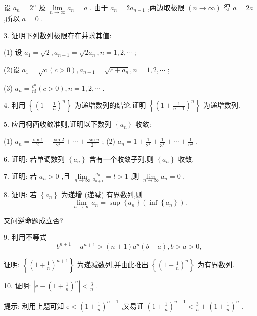 \begin{solution}
设 \({a}_{n} = {2}^{n}\) 及 \(\mathop{\lim }\limits_{{n \rightarrow  \infty }}{a}_{n} = a\) . 由于 \({a}_{n} = 2{a}_{n - 1}\) ,两边取极限 \(\left( {n \rightarrow  \infty }\right)\) 得 \(a = {2a}\) ,所以 \(a = 0\) .
\end{solution}


3. 证明下列数列极限存在并求其值:

(1) 设 \({a}_{1} = \sqrt{2},{a}_{n + 1} = \sqrt{2{a}_{n}},n = 1,2,\cdots\) ;

(2)设 \({a}_{1} = \sqrt{c}\left( {c > 0}\right) ,{a}_{n + 1} = \sqrt{c + {a}_{n}},n = 1,2,\cdots\) ;

(3) \({a}_{n} = \frac{{c}^{n}}{n!}\left( {c > 0}\right) ,n = 1,2,\cdots\) .

4. 利用 \(\left\{  {\left( 1 + \frac{1}{n}\right) }^{n}\right\}\) 为递增数列的结论,证明 \(\left\{  {\left( 1 + \frac{1}{n + 1}\right) }^{n}\right\}\) 为递增数列.

5. 应用柯西收敛准则,证明以下数列 \(\left\{  {a}_{n}\right\}\) 收敛:

(1) \({a}_{n} = \frac{\sin 1}{2} + \frac{\sin 2}{{2}^{2}} + \cdots  + \frac{\sin n}{{2}^{n}}\) ; (2) \({a}_{n} = 1 + \frac{1}{{2}^{2}} + \frac{1}{{3}^{2}} + \cdots  + \frac{1}{{n}^{2}}\) .

6. 证明: 若单调数列 \(\left\{  {a}_{n}\right\}\) 含有一个收敛子列,则 \(\left\{  {a}_{n}\right\}\) 收敛.

7. 证明: 若 \({a}_{n} > 0\) ,且 \(\mathop{\lim }\limits_{{n \rightarrow  \infty }}\frac{{a}_{n}}{{a}_{n + 1}} = l > 1\) ,则 \(\mathop{\lim }\limits_{{n \rightarrow  \infty }}{a}_{n} = 0\) .

8. 证明: 若 \(\left\{  {a}_{n}\right\}\) 为递增 (递减) 有界数列,则
\[
\mathop{\lim }\limits_{{n \rightarrow  \infty }}{a}_{n} = \sup \left\{  {a}_{n}\right\}  \left( {\inf \left\{  {a}_{n}\right\}  }\right) .
\]

又问逆命题成立否?

9. 利用不等式
\[
{b}^{n + 1} - {a}^{n + 1} > \left( {n + 1}\right) {a}^{n}\left( {b - a}\right) ,b > a > 0,
\]

证明: \(\left\{  {\left( 1 + \frac{1}{n}\right) }^{n + 1}\right\}\) 为递减数列,并由此推出 \(\left\{  {\left( 1 + \frac{1}{n}\right) }^{n}\right\}\) 为有界数列.

10. 证明: \(\left| {\mathrm{e} - {\left( 1 + \frac{1}{n}\right) }^{n}}\right|  < \frac{3}{n}\) .

提示: 利用上题可知 \(\mathrm{e} < {\left( 1 + \frac{1}{n}\right) }^{n + 1}\) ,又易证 \({\left( 1 + \frac{1}{n}\right) }^{n + 1} < \frac{3}{n} + {\left( 1 + \frac{1}{n}\right) }^{n}\) .


